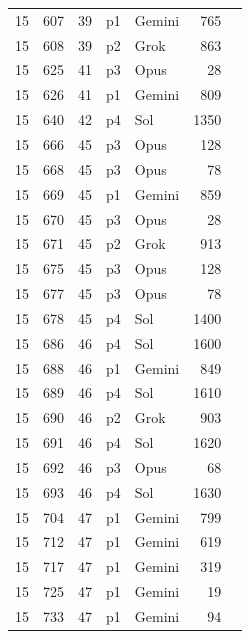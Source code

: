 \begin{longtable}{r r r l l r L{2.3in}}
15 & 607 & 39 & p1 & Gemini & 765 &  \\
15 & 608 & 39 & p2 & Grok & 863 &  \\
15 & 625 & 41 & p3 & Opus & 28 &  \\
15 & 626 & 41 & p1 & Gemini & 809 &  \\
15 & 640 & 42 & p4 & Sol & 1350 &  \\
15 & 666 & 45 & p3 & Opus & 128 &  \\
15 & 668 & 45 & p3 & Opus & 78 &  \\
15 & 669 & 45 & p1 & Gemini & 859 &  \\
15 & 670 & 45 & p3 & Opus & 28 &  \\
15 & 671 & 45 & p2 & Grok & 913 &  \\
15 & 675 & 45 & p3 & Opus & 128 &  \\
15 & 677 & 45 & p3 & Opus & 78 &  \\
15 & 678 & 45 & p4 & Sol & 1400 &  \\
15 & 686 & 46 & p4 & Sol & 1600 &  \\
15 & 688 & 46 & p1 & Gemini & 849 &  \\
15 & 689 & 46 & p4 & Sol & 1610 &  \\
15 & 690 & 46 & p2 & Grok & 903 &  \\
15 & 691 & 46 & p4 & Sol & 1620 &  \\
15 & 692 & 46 & p3 & Opus & 68 &  \\
15 & 693 & 46 & p4 & Sol & 1630 &  \\
15 & 704 & 47 & p1 & Gemini & 799 &  \\
15 & 712 & 47 & p1 & Gemini & 619 &  \\
15 & 717 & 47 & p1 & Gemini & 319 &  \\
15 & 725 & 47 & p1 & Gemini & 19 &  \\
15 & 733 & 47 & p1 & Gemini & 94 &  \\

\end{longtable}
